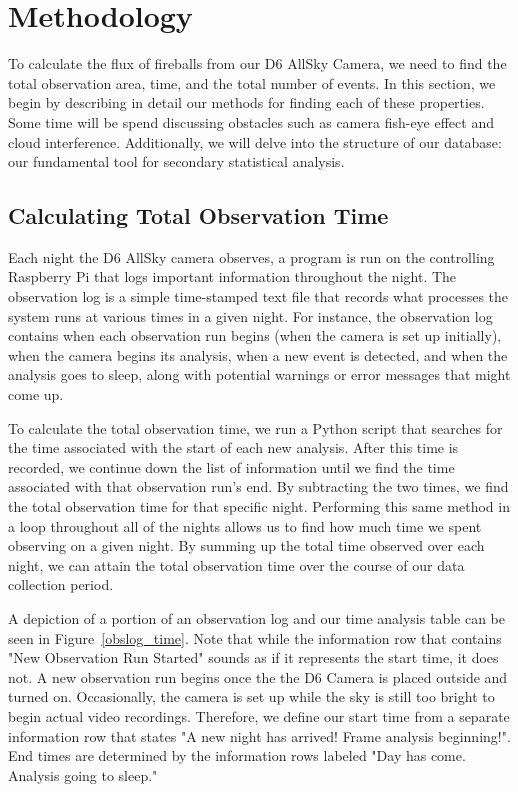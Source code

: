 

\chapter{Methodology}

To calculate the flux of fireballs from our D6 AllSky Camera, we need to find the total observation area, time, and the total number of events.
In this section, we begin by describing in detail our methods for finding each of these properties.
Some time will be spend discussing obstacles such as camera fish-eye effect and cloud interference.  
Additionally, we will delve into the structure of our database: our fundamental tool for secondary statistical analysis.

\section{Calculating Total Observation Time}

Each night the D6 AllSky camera observes, a program is run on the controlling Raspberry Pi that logs important information throughout the night.
The observation log is a simple time-stamped text file that records what processes the system runs at various times in a given night.
For instance, the observation log contains when each observation run begins (when the camera is set up initially), when the camera begins its analysis, when a new event is detected, and when the analysis goes to sleep, along with potential warnings or error messages that might come up.

To calculate the total observation time, we run a Python script that searches for the time associated with the start of each new analysis.  
After this time is recorded, we continue down the list of information until we find the time associated with that observation run's end.  
By subtracting the two times, we find the total observation time for that specific night.  
Performing this same method in a loop throughout all of the nights allows us to find how much time we spent observing on a given night. 
By summing up the total time observed over each night, we can attain the total observation time over the course of our data collection period.

A depiction of a portion of an observation log and our time analysis table can be seen in Figure~\ref{obslog_time}.
Note that while the information row that contains "New Observation Run Started" sounds as if it represents the start time, it does not.
A new observation run begins once the the D6 Camera is placed outside and turned on.  
Occasionally, the camera is set up while the sky is still too bright to begin actual video recordings. 
Therefore, we define our start time from a separate information row that states "A new night has arrived! Frame analysis beginning!". 
End times are determined by the information rows labeled "Day has come.  Analysis going to sleep."

